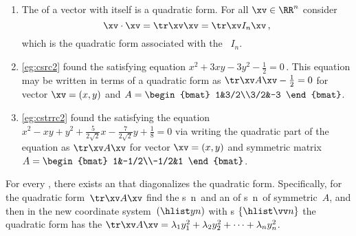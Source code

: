 \begin{example} 
\begin{enumerate}
\item The  of a vector with itself is a quadratic form.
For all \(\xv\in\RR^n\) consider
\begin{equation*}
\xv\cdot\xv=\tr\xv\xv=\tr\xv I_n\xv\,,
\end{equation*}
which is the quadratic form associated with the ~\(I_n\).


\item \cref{eg:csrc2} found the  satisfying equation \(x^2+3xy-3y^2-\tfrac12=0\)\,.
This equation may be written in terms of a quadratic form as \(\tr\xv A\xv-\tfrac12=0\) for vector \(\xv=(x,y)\) and  \(A=\begin{bmat} 1&3/2\\3/2&-3 \end{bmat}\).


\item \cref{eg:cstrrc2} found the  satisfying the equation
\(x^2-xy+y^2+\tfrac5{2\sqrt2}x-\tfrac7{2\sqrt2}y+\tfrac18=0\) via writing the quadratic part of the equation as \(\tr\xv A\xv\) for vector \(\xv=(x,y)\) and symmetric matrix \(A=\begin{bmat} 1&-1/2\\-1/2&1 \end{bmat}\).
\end{enumerate}
\end{example}


\begin{theorem} \label{thm:patqform}
For every , there exists an   that diagonalizes the quadratic form.
Specifically, for the quadratic form~\(\tr\xv A\xv\) find the 
s~\hlist\lambda n\ and an  of s~\hlist\vv n\ of symmetric~\(A\), and then in the new coordinate system~\((\hlist yn)\) with s \(\{\hlist\vv n\}\) the quadratic form has the  \(\tr\xv A\xv=\lambda_1y_1^2+\lambda_2y_2^2+\cdots+\lambda_ny_n^2\).
\end{theorem}

